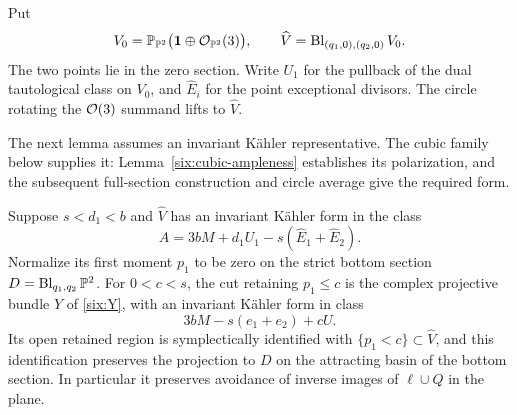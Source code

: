 Put
\[
 V_0=\mathbb P_{\mathbb P^2}\bigl(\mathbf1\oplus\mathcal O_{\mathbb P^2}(3)\bigr),
 \qquad
 \widehat V=\operatorname{Bl}_{(q_1,0),(q_2,0)} V_0 .
 \]
The two points lie in the zero section.  Write \(U_1\) for the
pullback of the dual tautological class on \(V_0\), and
\(\widehat E_i\) for the point exceptional divisors.  The circle
rotating the \(\mathcal O(3)\) summand lifts to \(\widehat V\).

The next lemma assumes an invariant K\"ahler representative.
The cubic family below supplies it: Lemma~\ref{six:cubic-ampleness}
establishes its polarization, and the subsequent full-section
construction and circle average give the required form.

\begin{lemma}\label{six:cut}
Suppose \(s<d_1<b\) and \(\widehat V\) has an invariant Kähler form
in the class
\begin{equation}\label{six:Vhat-class}
 A=3bM+d_1U_1-s(\widehat E_1+\widehat E_2).
\end{equation}
Normalize its first moment \(p_1\) to be zero on the strict bottom
section \(D=\operatorname{Bl}_{q_1,q_2}\mathbb P^2\).  For \(0<c<s\), the cut retaining
\(p_1\le c\) is the complex projective bundle \(Y\) of
\eqref{six:Y}, with an invariant Kähler form in class
\[
 3bM-s(e_1+e_2)+cU.
\]
Its open retained region is symplectically identified with
\(\{p_1<c\}\subset\widehat V\), and this identification preserves
the projection to \(D\) on the attracting basin of the bottom
section.  In particular it preserves avoidance of inverse images
of \(\ell\cup Q\) in the plane.
\end{lemma}


